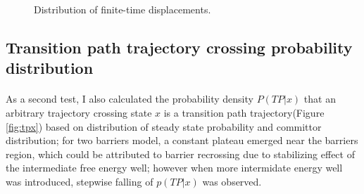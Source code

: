 \documentclass[11pt, a4paper]{article}
\begin{document}
\begin{figure}[H]
  \noindent{}
  \caption{Distribution of finite-time displacements.}
  \label{fig:dx}
\end{figure}

\subsection{Transition path trajectory crossing probability distribution}

\paragraph{}As a second test, I also calculated the probability density $P(TP|x)$ that an arbitrary trajectory crossing state $x$ is a transition path trajectory(Figure \ref{fig:tpx}) based on distribution of steady state probability and committor distribution;
 for two barriers model, a constant plateau emerged near the barriers region,
 which could be attributed to barrier recrossing due to stabilizing effect of the intermediate free energy well; however when more intermidate energy well was introduced, stepwise falling of $p(TP|x)$ was observed.
\end{document}
